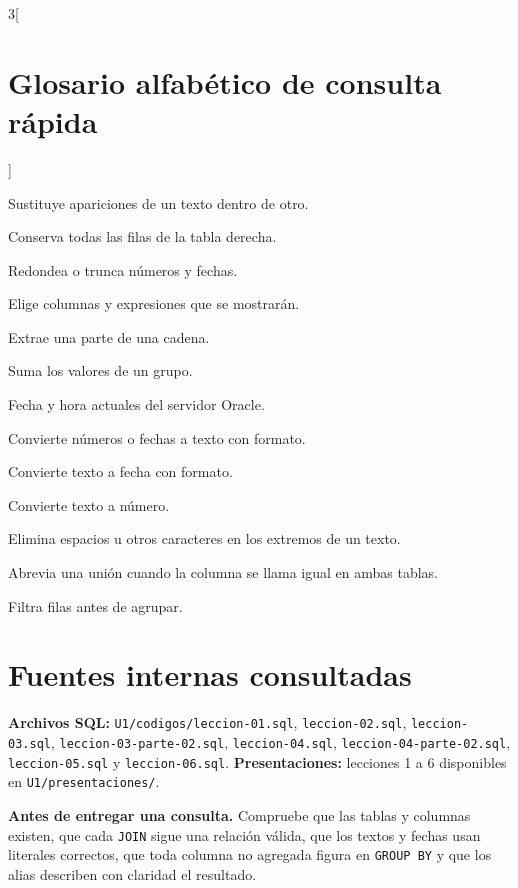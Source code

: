 \documentclass[10pt,letterpaper]{article}
\newenvironment{ideaclave}[1][Idea clave]
  {\par\smallskip\begingroup\raggedright
   \noindent\textcolor{turquesa}{\textbf{#1.}}\enspace}
  {\par\endgroup\smallskip}
\newenvironment{glossarylist}
  {\begin{description}[
    style=unboxed,
    leftmargin=0pt,
    labelindent=0pt,
    labelsep=0.45em,
    itemsep=0.18em,
    parsep=0pt,
    topsep=0.2em,
    font=\normalfont\ttfamily\bfseries]}
  {\end{description}}
\begin{document}
\begin{multicols}{3}[\section{Glosario alfabético de consulta rápida}]
\begin{glossarylist}
\item[REPLACE] Sustituye apariciones de un texto dentro de otro.
\item[RIGHT JOIN] Conserva todas las filas de la tabla derecha.
\item[ROUND / TRUNC] Redondea o trunca números y fechas.
\item[SELECT] Elige columnas y expresiones que se mostrarán.
\item[SUBSTR] Extrae una parte de una cadena.
\item[SUM] Suma los valores de un grupo.
\item[SYSDATE] Fecha y hora actuales del servidor Oracle.
\item[TO\_CHAR] Convierte números o fechas a texto con formato.
\item[TO\_DATE] Convierte texto a fecha con formato.
\item[TO\_NUMBER] Convierte texto a número.
\item[TRIM] Elimina espacios u otros caracteres en los extremos de un texto.
\item[USING] Abrevia una unión cuando la columna se llama igual en ambas tablas.
\item[WHERE] Filtra filas antes de agrupar.
\end{glossarylist}
\end{multicols}

\section*{Fuentes internas consultadas}

{\small
\textbf{Archivos SQL:}
\nolinkurl{U1/codigos/leccion-01.sql},
\nolinkurl{leccion-02.sql},
\nolinkurl{leccion-03.sql},
\nolinkurl{leccion-03-parte-02.sql},
\nolinkurl{leccion-04.sql},
\nolinkurl{leccion-04-parte-02.sql},
\nolinkurl{leccion-05.sql} y
\nolinkurl{leccion-06.sql}.
\textbf{Presentaciones:} lecciones 1 a 6 disponibles en
\nolinkurl{U1/presentaciones/}.\par}

\begin{ideaclave}[Antes de entregar una consulta]
Compruebe que las tablas y columnas existen, que cada \texttt{JOIN} sigue una
relación válida, que los textos y fechas usan literales correctos, que toda
columna no agregada figura en \texttt{GROUP BY} y que los alias describen con
claridad el resultado.
\end{ideaclave}
\end{document}
